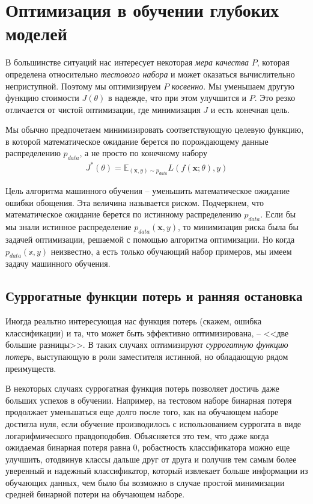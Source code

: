 \documentclass[%
	11pt,
	a4paper,
	utf8,
]{article}
\begin{document}
\section{Оптимизация в обучении глубоких моделей}

В большинстве ситуаций нас интересует некоторая \emph{мера качества} $ P $, которая определена относительно \emph{тестового набора} и может оказаться вычислительно неприступной. Поэтому мы оптимизируем $ P $ \emph{косвенно}. Мы уменьшаем другую функцию стоимости $ J(\theta) $ в надежде, что при этом улучшится и $ P $. Это резко отличается от чистой оптимизации, где минимизация $ J $ и есть конечная цель.

Мы обычно предпочетаем минимизировать соответствующую целевую функцию, в которой математическое ожидание берется по порождающему данные распределению $ p_{data} $, а не просто по конечному набору
\begin{align*}
	J^*(\theta) = \mathbb{E}_{ (\mathbf{x}, y) \sim p_{data} } L(f(\mathbf{x}; \theta), y)
\end{align*}

Цель алгоритма машинного обучения -- уменьшить математическое ожидание ошибки обощения. Эта величина называется риском. Подчеркнем, что математическое ожидание берется по истинному распределению $ p_{data} $. Если бы мы знали истинное распределение $ p_{data}(\mathbf{x}, y) $, то минимизация риска была бы задачей оптимизации, решаемой с помощью алгоритма оптимизации. Но когда $ p_{data}(\mathbb{x}, y) $ неизвестно, а есть только обучающий набор примеров, мы имеем задачу машинного обучения.

\subsection{Суррогатные функции потерь и ранняя остановка}

Иногда реальтно интересующая нас функция потерь (скажем, ошибка классификации) и та, что может быть эффективно оптимизирована, -- <<две большие разницы>>. В таких случаях оптимизируют \emph{суррогатную функцию потерь}, выступающую в роли заместителя истинной, но обладающую рядом преимуществ. 

В некоторых случаях суррогатная функция потерь позволяет достичь даже больших успехов в обучении. Например, на тестовом наборе бинарная потеря продолжает уменьшаться еще долго после того, как на обучающем наборе достигла нуля, если обучение производилось с использованием суррогата в виде логарифмического правдоподобия. Объясняется это тем, что даже когда ожидаемая бинарная потеря равна 0, робастность классификатора можно еще улучшить, отодвинув классы дальше друг от друга и получив тем самым более уверенный и надежный классификатор, который извлекает больше информации из обучающих данных, чем было бы возможно в случае простой минимизации средней бинарной потери на обучающем наборе.
\end{document}
